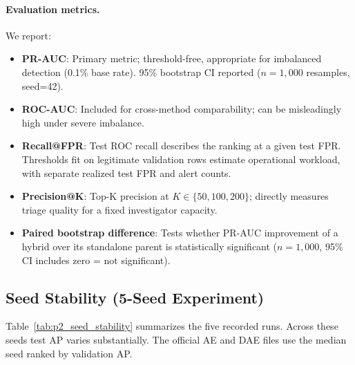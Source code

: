 \paragraph{Evaluation metrics.}
We report:
\begin{itemize}
  \item \textbf{PR-AUC}: Primary metric; threshold-free, appropriate for imbalanced detection (0.1\% base rate). 95\% bootstrap CI reported ($n=1{,}000$ resamples, seed=42).
  \item \textbf{ROC-AUC}: Included for cross-method comparability; can be misleadingly high under severe imbalance.
  \item \textbf{Recall@FPR}: Test ROC recall describes the ranking at a given test FPR. Thresholds fit on legitimate validation rows estimate operational workload, with separate realized test FPR and alert counts.
  \item \textbf{Precision@K}: Top-K precision at $K \in \{50, 100, 200\}$; directly measures triage quality for a fixed investigator capacity.
  \item \textbf{Paired bootstrap difference}: Tests whether PR-AUC improvement of a hybrid over its standalone parent is statistically significant ($n=1{,}000$, 95\% CI includes zero = not significant).
\end{itemize}

\subsection{Seed Stability (5-Seed Experiment)}
\label{sec:p2_seed_stability}

Table~\ref{tab:p2_seed_stability} summarizes the five recorded runs. Across these seeds test AP varies substantially. The official AE and DAE files use the median seed ranked by validation AP.

\begin{table}[t]
\centering
\caption{5-Seed Stability: Val and Test PR-AUC (mean $\pm$ std).}
\label{tab:p2_seed_stability}
\footnotesize
{}
\end{table}

